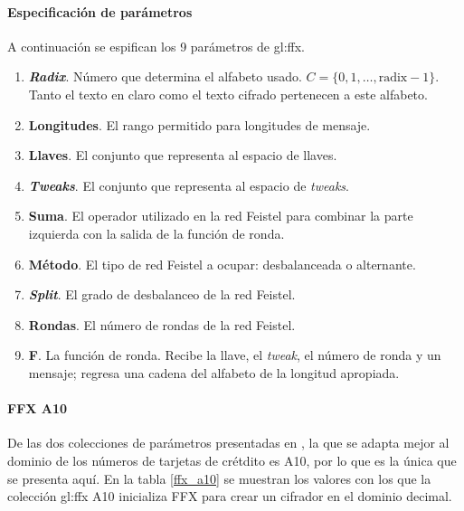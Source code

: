 \paragraph{Especificación de parámetros}

A continuación se espifican los 9 parámetros de \gls{gl:ffx}.

\begin{enumerate}

  \item \textbf{\textit{Radix}}.
    Número que determina el alfabeto usado.
    $ C = \{ 0, 1, \dots, \text{radix} - 1\} $. Tanto el texto en claro como
    el texto cifrado pertenecen a este alfabeto.

  \item \textbf{Longitudes}.
    El rango permitido para longitudes de mensaje.

  \item \textbf{Llaves}.
    El conjunto que representa al espacio de llaves.

  \item \textbf{\textit{Tweaks}}.
    El conjunto que representa al espacio de \textit{tweaks}.

  \item \textbf{Suma}.
    El operador utilizado en la red Feistel para combinar la parte izquierda
    con la salida de la función de ronda.

  \item \textbf{Método}.
    El tipo de red Feistel a ocupar: desbalanceada o alternante.

  \item \textbf{\textit{Split}}.
    El grado de desbalanceo de la red Feistel.

  \item \textbf{Rondas}.
    El número de rondas de la red Feistel.

  \item \textbf{F}.
    La función de ronda. Recibe la llave, el \textit{tweak}, el número de
    ronda y un mensaje; regresa una cadena del alfabeto de la longitud
    apropiada.

\end{enumerate}

\paragraph{FFX A10}

De las dos colecciones de parámetros presentadas en \cite{ffx_2}, la que se
adapta mejor al dominio de los números de tarjetas de crétdito es A10, por lo
que es la única que se presenta aquí. En la tabla \ref{ffx_a10} se muestran los
valores con los que la colección \gls{gl:ffx} A10 inicializa FFX para crear un
cifrador en el dominio decimal.

